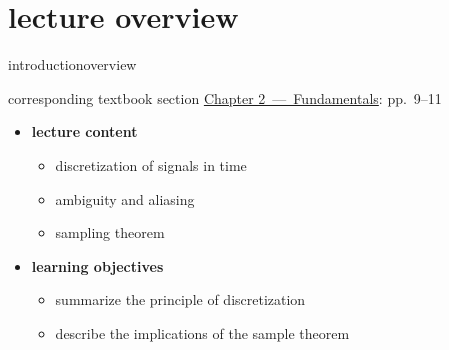 




\subtitle{Module 2.1: Fundamentals~---~Sampling}


	

    \section[overview]{lecture overview}
        \begin{frame}{introduction}{overview}
            \begin{block}{corresponding textbook section}
                    \href{http://ieeexplore.ieee.org/xpl/articleDetails.jsp?tp=&arnumber=6331119&}{Chapter 2~---~Fundamentals}: pp.~9--11
            \end{block}

            \begin{itemize}
                \item   \textbf{lecture content}
                    \begin{itemize}
                        \item   discretization of signals in time
                        \item   ambiguity and aliasing
                        \item   sampling theorem
                    \end{itemize}
                \bigskip
                \item<2->   \textbf{learning objectives}
                    \begin{itemize}
                        \item   summarize the principle of discretization
                        \item   describe the implications of the sample theorem
                    \end{itemize}
            \end{itemize}
        \end{frame}
        
